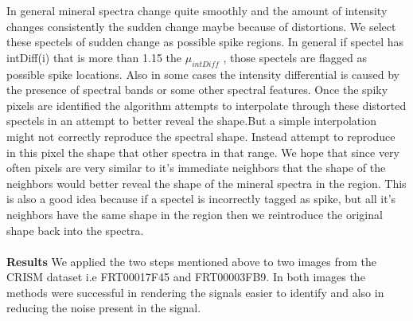 \documentclass[pdftex, 12pt,a4paper,oneside]{report}
\begin{document}
In general mineral spectra change quite smoothly and the amount of intensity changes consistently the sudden change maybe because of distortions. We select these spectels of sudden change as possible spike regions. In general if spectel has intDiff(i) that is more than 1.15 the $\mu_{intDiff}$ , those spectels are flagged as possible spike locations. Also in some cases the intensity differential is caused by the presence of spectral bands or some other spectral features. Once the spiky pixels are identified the algorithm attempts to interpolate through these distorted spectels in an attempt to better reveal the shape.But a simple interpolation might not correctly reproduce the spectral shape. Instead attempt to reproduce in this pixel the shape that other spectra in that range. We hope that since very often pixels are very similar to it's immediate neighbors that the shape of the neighbors would better reveal the shape of the mineral spectra in the region. This is also a good idea because if a spectel is incorrectly tagged as spike, but all it's neighbors have the same shape in the region then we reintroduce the original shape back into the spectra.\\
\\
\textbf{Results}
We applied the two steps mentioned above to two images from the CRISM dataset i.e FRT00017F45 and FRT00003FB9. In both images the methods were successful in rendering the signals easier to identify and also in reducing the noise present in the signal. 
\end{document}
